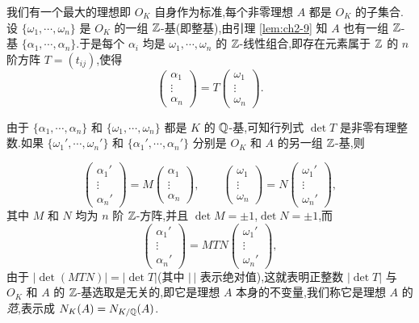 我们有一个最大的理想即 $O_K$ 自身作为标准,每个非零理想 $A$ 都是 $O_K$ 的子集合.设 $\{\omega_1,\cdots,\omega_n\}$ 是 $O_K$ 的一组 $\mathbb{Z}$-基(即整基),由引理 \ref{lem:ch2-9} 知 $A$ 也有一组 $\mathbb{Z}$-基 $\{\alpha_1,\cdots,\alpha_n\}$.于是每个 $\alpha_i$ 均是 $\omega_1,\cdots,\omega_n$ 的 $\mathbb{Z}$-线性组合,即存在元素属于 $\mathbb{Z}$ 的 $n$ 阶方阵 $T=(t_{ij})$,使得
\[
  \begin{pmatrix}\alpha_1\\ \vdots\\ \alpha_n\end{pmatrix}
  =T\begin{pmatrix}\omega_1\\ \vdots\\ \omega_n\end{pmatrix}.
\]
\begin{sloppypar}
由于 $\{\alpha_1,\cdots,\alpha_n\}$ 和 $\{\omega_1,\cdots,\omega_n\}$ 都是 $K$ 的 $\mathbb{Q}$-基,可知行列式 $\det T$ 是非零有理整数.如果 $\{\omega_1',\cdots,\omega_n'\}$ 和 $\{\alpha_1',\cdots,\alpha_n'\}$ 分别是 $O_K$ 和 $A$ 的另一组 $\mathbb{Z}$-基,则
\end{sloppypar}
\[
  \begin{pmatrix}\alpha_1'\\ \vdots\\ \alpha_n'\end{pmatrix}
  =M\begin{pmatrix}\alpha_1\\ \vdots\\ \alpha_n\end{pmatrix},\qquad
  \begin{pmatrix}\omega_1\\ \vdots\\ \omega_n\end{pmatrix}
  =N\begin{pmatrix}\omega_1'\\ \vdots\\ \omega_n'\end{pmatrix},
\]
其中 $M$ 和 $N$ 均为 $n$ 阶 $\mathbb{Z}$-方阵,并且 $\det M=\pm 1$,$\det N=\pm 1$,而
\[
  \begin{pmatrix}\alpha_1'\\ \vdots\\ \alpha_n'\end{pmatrix}
  =MTN\begin{pmatrix}\omega_1'\\ \vdots\\ \omega_n'\end{pmatrix},
\]
由于 $|\det(MTN)|=|\det T|$(其中 $|\,|$ 表示绝对值),这就表明正整数 $|\det T|$ 与 $O_K$ 和 $A$ 的 $\mathbb{Z}$-基选取是无关的,即它是理想 $A$ 本身的不变量,我们称它是理想 $A$ 的\emph{范},表示成 $N_K(A)=N_{K/\mathbb{Q}}(A)$.

